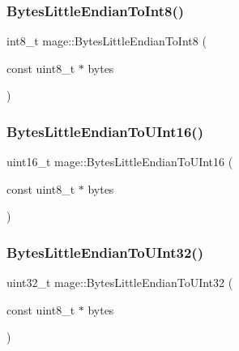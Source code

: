 \subsubsection{\texorpdfstring{Bytes\+Little\+Endian\+To\+Int8()}{BytesLittleEndianToInt8()}}
{\footnotesize\ttfamily int8\+\_\+t mage\+::\+Bytes\+Little\+Endian\+To\+Int8 (\begin{DoxyParamCaption}\item[{const uint8\+\_\+t $\ast$}]{bytes }\end{DoxyParamCaption})}

\hypertarget{namespacemage_aca75f80f9445dd764414522db4967336}{}\label{namespacemage_aca75f80f9445dd764414522db4967336} 
\subsubsection{\texorpdfstring{Bytes\+Little\+Endian\+To\+U\+Int16()}{BytesLittleEndianToUInt16()}}
{\footnotesize\ttfamily uint16\+\_\+t mage\+::\+Bytes\+Little\+Endian\+To\+U\+Int16 (\begin{DoxyParamCaption}\item[{const uint8\+\_\+t $\ast$}]{bytes }\end{DoxyParamCaption})}

\hypertarget{namespacemage_a453e851f136573bfc7839157786472a4}{}\label{namespacemage_a453e851f136573bfc7839157786472a4} 
\subsubsection{\texorpdfstring{Bytes\+Little\+Endian\+To\+U\+Int32()}{BytesLittleEndianToUInt32()}}
{\footnotesize\ttfamily uint32\+\_\+t mage\+::\+Bytes\+Little\+Endian\+To\+U\+Int32 (\begin{DoxyParamCaption}\item[{const uint8\+\_\+t $\ast$}]{bytes }\end{DoxyParamCaption})}

\hypertarget{namespacemage_ae6f54de05a834fbb34a75312479009ba}{}\label{namespacemage_ae6f54de05a834fbb34a75312479009ba} 
